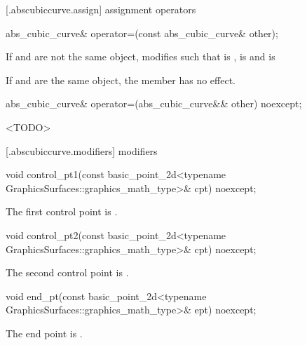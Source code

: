  [\iotwod.abscubiccurve.assign] { assignment operators}

%
\begin{itemdecl}
abs_cubic_curve& operator=(const abs_cubic_curve& other);
\end{itemdecl}
\begin{itemdescr}
\pnum
\effects
If  and  are not the same object, modifies  such that  is ,  is  and  is 

\pnum
If  and  are the same object, the member has no effect.

\pnum
\returns
{}
\end{itemdescr}

%
\begin{itemdecl}
abs_cubic_curve& operator=(abs_cubic_curve&& other) noexcept;
\end{itemdecl}
\begin{itemdescr}
\pnum
\effects
<TODO>

\pnum
\returns
{}
\end{itemdescr}

 [\iotwod.abscubiccurve.modifiers]{ modifiers}

%
\begin{itemdecl}
void control_pt1(const basic_point_2d<typename
  GraphicsSurfaces::graphics_math_type>& cpt) noexcept;
\end{itemdecl}
\begin{itemdescr}
\pnum
\effects
The first control point is .
\end{itemdescr}

%
\begin{itemdecl}
void control_pt2(const basic_point_2d<typename
  GraphicsSurfaces::graphics_math_type>& cpt) noexcept;
\end{itemdecl}
\begin{itemdescr}
\pnum
\effects
The second control point is .
\end{itemdescr}

%
\begin{itemdecl}
void end_pt(const basic_point_2d<typename GraphicsSurfaces::graphics_math_type>& ept) noexcept;
\end{itemdecl}
\begin{itemdescr}
\pnum
\effects
The end point is .
\end{itemdescr}

